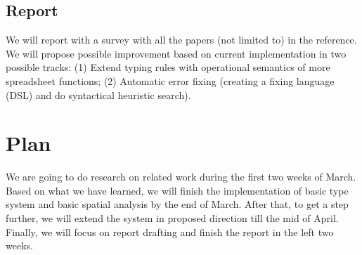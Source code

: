 \documentclass[a4paper]{article}
\begin{document}
\subsection{Report}
We will report with a survey with all the papers (not limited to) in the reference. We will propose possible improvement based on current implementation in two possible tracks: (1) Extend typing rules with operational semantics of more spreadsheet functions; (2) Automatic error fixing (creating a fixing language (DSL) and do syntactical heuristic search).

\section{Plan}
We are going to do research on related work during the first two weeks of March. Based on what we have learned, we will finish the implementation of basic type system and basic spatial analysis by the end of March. After that, to get a step further, we will extend the system in proposed direction till the mid of April. Finally, we will focus on report drafting and finish the report in the left two weeks.

\nocite{*}



\end{document}
